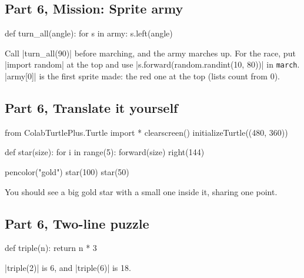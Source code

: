 \subsection*{Part 6, Mission: Sprite army}
\begin{codenonum}
def turn_all(angle):
    for s in army:
        s.left(angle)
\end{codenonum}
Call \py|turn_all(90)| before marching, and the army marches up. For the race, put \py|import random| at the top and use \py|s.forward(random.randint(10, 80))| in \texttt{march}. \py|army[0]| is the first sprite made: the red one at the top (lists count from 0).

\subsection*{Part 6, Translate it yourself}
\begin{codenonum}
from ColabTurtlePlus.Turtle import *
clearscreen()
initializeTurtle((480, 360))

def star(size):
    for i in range(5):
        forward(size)
        right(144)

pencolor("gold")
star(100)
star(50)
\end{codenonum}
You should see a big gold star with a small one inside it, sharing one point.

\subsection*{Part 6, Two-line puzzle}
\begin{codenonum}
def triple(n):
    return n * 3
\end{codenonum}
\py|triple(2)| is 6, and \py|triple(6)| is 18.
